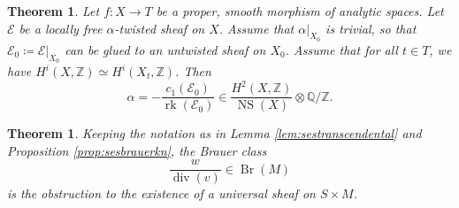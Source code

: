 \documentclass[11pt,twoside]{amsart}
\numberwithin{equation}{section}
\newtheorem{theorem}[dummy]{Theorem}
\theoremstyle{definition}
\theoremstyle{plain}
\newcommand{\Z}{\ensuremath{\mathbb{Z}}}
\newcommand{\Q}{\ensuremath{\mathbb{Q}}}
\def\NS{\operatorname{NS}}
\def\Br{\operatorname{Br}}
\def\dv{\operatorname{div}}
\begin{document}
\begin{theorem}\label{thm:CaldaIdentificationBrauerClassFamily}
    Let $f: X\to T$ be a proper, smooth morphism of analytic spaces. Let $\mathcal{E}$ be a locally free $\alpha$-twisted sheaf on $X$. Assume that $\alpha|_{X_0}$ is trivial, so that $\mathcal{E}_0\coloneqq \mathcal{E}|_{X_0}$ can be glued to an untwisted sheaf on $X_0$. Assume that for all $t\in T$, we have $H^i(X,\Z)\simeq H^i(X_t,\Z)$. Then  $$\alpha = -\frac{c_1(\mathcal{E}_0)}{\operatorname{rk}(\mathcal{E}_0)} \in \frac{H^2(X,\Z)}{\NS(X)}\otimes \Q/\Z.$$
\end{theorem}


\begin{theorem}\label{thm:explicitobstruction}
    Keeping the notation as in Lemma \ref{lem:sestranscendental} and Proposition \ref{prop:sesbrauerkn}, the Brauer class $$\frac{w}{\dv(v)}\in \Br(M)$$ is the obstruction to the existence of a universal sheaf on $S\times M$.
\end{theorem}
\end{document}
